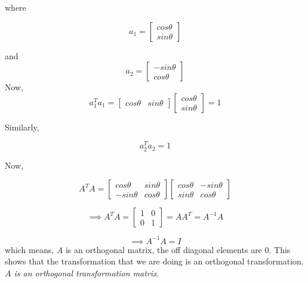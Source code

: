 \documentclass[12pt,a4paper]{report}
\begin{document}
where 

\begin{equation}
a_1 = 
\begin{bmatrix}
    cos \theta  \\
     sin \theta 
\end{bmatrix}
\end{equation} 

and 
\begin{equation}
a_2 = 
\begin{bmatrix}
    -sin \theta  \\
    cos \theta 
\end{bmatrix}
\end{equation} 
Now, 
\begin{equation}
a_1^T a_1 =
\begin{bmatrix}
    cos \theta  & sin \theta 
\end{bmatrix}
\begin{bmatrix}
    cos \theta  \\
     sin \theta 
\end{bmatrix}
=
1
\end{equation}

Similarly,

\begin{equation}
a_2^T a_2 = 1
\end{equation}

Now,

\begin{equation}
A^T A = 
\begin{bmatrix}
    cos \theta & sin \theta \\
    -sin \theta & cos \theta
\end{bmatrix}
\begin{bmatrix}
    cos \theta & -sin \theta \\
     sin \theta & cos \theta
\end{bmatrix}
\end{equation}

\begin{equation}
\implies
A^T A = 
\begin{bmatrix}
    1 & 0 \\
    0 & 1
\end{bmatrix}
= A A^T
= A^{-1} A
\end{equation}

\begin{equation}
\implies
A^{-1} A = 
I
\end{equation}
which means, $A$ is an orthogonal matrix, the off diagonal elements are $0$. This shows that the transformation that we are doing is an orthogonal transformation. \textit{$A$ is an orthogonal transformation matrix}.\\
\end{document}
